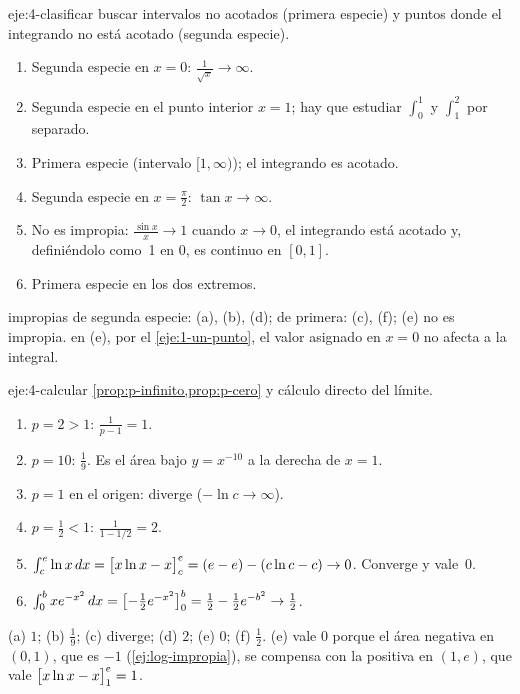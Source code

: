 \begin{solucion}{eje:4-clasificar}
\planteamiento buscar intervalos no acotados (primera especie) y puntos donde el integrando no está acotado (segunda especie).
\pasos
\begin{enumerate}[label=(\alph*)]
  \item Segunda especie en $x=0$: $\frac{1}{\sqrt x}\to\infty$.
  \item Segunda especie en el punto interior $x=1$; hay que estudiar $\int_0^{1}$ y $\int_1^{2}$ por separado.
  \item Primera especie (intervalo $[1,\infty)$); el integrando es acotado.
  \item Segunda especie en $x=\frac\pi2$: $\tan x\to\infty$.
  \item No es impropia: $\frac{\sin x}{x}\to1$ cuando $x\to0$, el integrando está acotado y, definiéndolo como~1 en $0$, es continuo en $[0,1]$.
  \item Primera especie en los dos extremos.
\end{enumerate}
\resultado impropias de segunda especie: (a), (b), (d); de primera: (c), (f); (e) no es impropia.
\comprobacion en (e), por el \cref{eje:1-un-punto}, el valor asignado en $x=0$ no afecta a la integral.
\end{solucion}

\begin{solucion}{eje:4-calcular}
\planteamiento \cref{prop:p-infinito,prop:p-cero} y cálculo directo del límite.
\pasos
\begin{enumerate}[label=(\alph*)]
  \item $p=2>1$: $\frac{1}{p-1}=1$.
  \item $p=10$: $\frac19$. Es el área bajo $y=x^{-10}$ a la derecha de $x=1$.
  \item $p=1$ en el origen: diverge ($-\ln c\to\infty$).
  \item $p=\frac12<1$: $\frac{1}{1-1/2}=2$.
  \item $\int_c^{e}\ln x\mathop{}\!d x=\bigl[x\ln x-x\bigr]_{c}^{e}=(e-e)-(c\ln c-c)\to0$. Converge y vale~$0$.
  \item $\int_0^{b}xe^{-x^{2}}\mathop{}\!d x=\bigl[-\frac12e^{-x^{2}}\bigr]_{0}^{b}=\frac12-\frac12e^{-b^{2}}\to\frac12$.
\end{enumerate}
\resultado (a) $1$; (b) $\frac19$; (c) diverge; (d) $2$; (e) $0$; (f) $\frac12$.
\comprobacion (e) vale $0$ porque el área negativa en $(0,1)$, que es $-1$ (\cref{ej:log-impropia}), se compensa con la positiva en $(1,e)$, que vale $\bigl[x\ln x-x\bigr]_{1}^{e}=1$.
\end{solucion}

